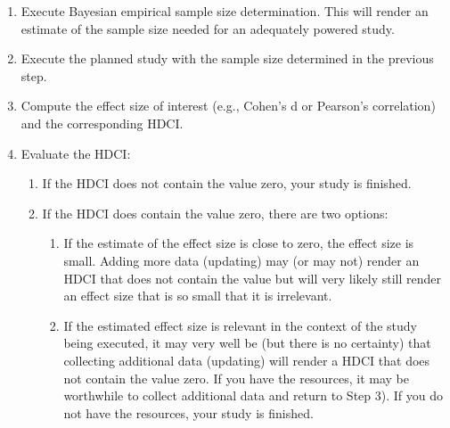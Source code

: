 \documentclass[
  letterpaper,
  DIV=11,
  numbers=noendperiod]{scrartcl}
\begin{document}
\begin{enumerate}
\def\labelenumi{\arabic{enumi}.}
\item
  Execute Bayesian empirical sample size determination. This will render
  an estimate of the sample size needed for an adequately powered study.
\item
  Execute the planned study with the sample size determined in the
  previous step.
\item
  Compute the effect size of interest (e.g., Cohen's d or Pearson's
  correlation) and the corresponding HDCI.
\item
  Evaluate the HDCI:

  \begin{enumerate}
  \def\labelenumii{\alph{enumii}.}
  \item
    If the HDCI does not contain the value zero, your study is finished.
  \item
    If the HDCI does contain the value zero, there are two options:

    \begin{enumerate}
    \def\labelenumiii{\roman{enumiii}.}
    \item
      If the estimate of the effect size is close to zero, the effect
      size is small. Adding more data (updating) may (or may not) render
      an HDCI that does not contain the value but will very likely still
      render an effect size that is so small that it is irrelevant.
    \item
      If the estimated effect size is relevant in the context of the
      study being executed, it may very well be (but there is no
      certainty) that collecting additional data (updating) will render
      a HDCI that does not contain the value zero. If you have the
      resources, it may be worthwhile to collect additional data and
      return to Step 3). If you do not have the resources, your study is
      finished.
    \end{enumerate}
  \end{enumerate}
\end{enumerate}
\end{document}
